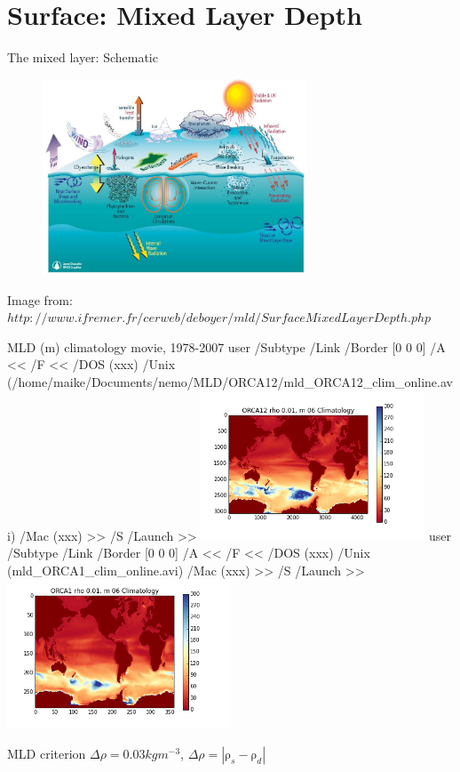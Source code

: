 \documentclass{beamer}
\newcommand{\LaunchBinary}[2]{%
  \leavevmode%
  \pdfstartlink user {
    /Subtype /Link
    /Border [0 0 0]%
    /A <<
      /F <<
         /DOS (xxx)
         /Unix (#1)
         /Mac (xxx)
      >>
      /S /Launch
    >>
  }#2%
  \pdfendlink%
}
\begin{document}
\section{Surface: Mixed Layer Depth}
\begin{frame}{The mixed layer: Schematic}
\begin{figure}
\center \includegraphics[width=0.7\textwidth]{mixed_layer_schematic.png}
\end{figure}
\tiny Image from:$http://www.ifremer.fr/cerweb/deboyer/mld/SurfaceMixedLayerDepth.php$
\end{frame}

\begin{frame}{MLD (m) climatology movie, 1978-2007}
\LaunchBinary{/home/maike/Documents/nemo/MLD/ORCA12/mld_ORCA12_clim_online.avi}{\includegraphics[width=0.5\textwidth]{mld_ORCA12_clim_m06.png}}\LaunchBinary{mld_ORCA1_clim_online.avi}{\includegraphics[width=0.5\textwidth]{mld_ORCA1_clim_m06.png}}
\begin{alertblock}{MLD criterion }
\centering $\Delta \rho = 0.03 kg m^{-3}$, $ \Delta \rho = |\mathrm{\rho}_{s}-\mathrm{\rho}_{d}| $
\end{alertblock}

\end{frame}
\end{document}
